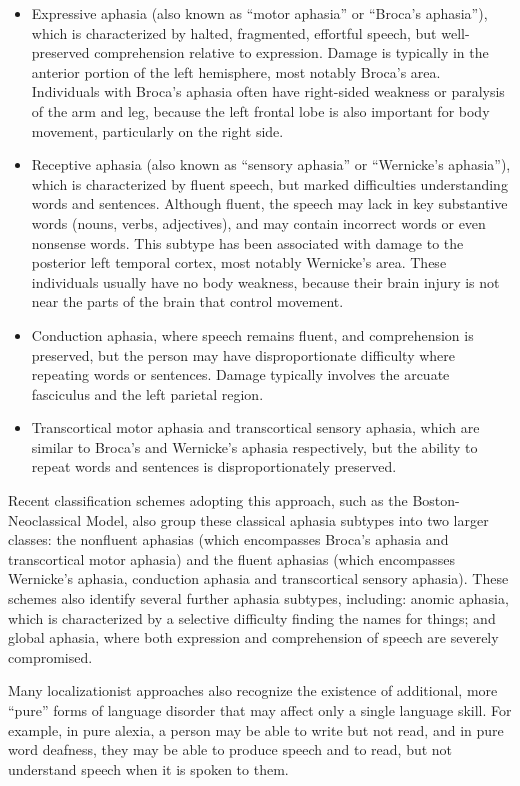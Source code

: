 \begin{itemize}
\tightlist
\item
  Expressive aphasia (also known as ``motor aphasia'' or ``Broca's
  aphasia''), which is characterized by halted, fragmented, effortful
  speech, but well-preserved comprehension relative to expression.
  Damage is typically in the anterior portion of the left hemisphere,
  most notably Broca's area. Individuals with Broca's aphasia often have
  right-sided weakness or paralysis of the arm and leg, because the left
  frontal lobe is also important for body movement, particularly on the
  right side.
\item
  Receptive aphasia (also known as ``sensory aphasia'' or ``Wernicke's
  aphasia''), which is characterized by fluent speech, but marked
  difficulties understanding words and sentences. Although fluent, the
  speech may lack in key substantive words (nouns, verbs, adjectives),
  and may contain incorrect words or even nonsense words. This subtype
  has been associated with damage to the posterior left temporal cortex,
  most notably Wernicke's area. These individuals usually have no body
  weakness, because their brain injury is not near the parts of the
  brain that control movement.
\item
  Conduction aphasia, where speech remains fluent, and comprehension is
  preserved, but the person may have disproportionate difficulty where
  repeating words or sentences. Damage typically involves the arcuate
  fasciculus and the left parietal region.
\item
  Transcortical motor aphasia and transcortical sensory aphasia, which
  are similar to Broca's and Wernicke's aphasia respectively, but the
  ability to repeat words and sentences is disproportionately preserved.
\end{itemize}

Recent classification schemes adopting this approach, such as the
Boston-Neoclassical Model, also group these classical aphasia subtypes
into two larger classes: the nonfluent aphasias (which encompasses
Broca's aphasia and transcortical motor aphasia) and the fluent aphasias
(which encompasses Wernicke's aphasia, conduction aphasia and
transcortical sensory aphasia). These schemes also identify several
further aphasia subtypes, including: anomic aphasia, which is
characterized by a selective difficulty finding the names for things;
and global aphasia, where both expression and comprehension of speech
are severely compromised.

Many localizationist approaches also recognize the existence of
additional, more ``pure'' forms of language disorder that may affect
only a single language skill. For example, in pure alexia, a person may
be able to write but not read, and in pure word deafness, they may be
able to produce speech and to read, but not understand speech when it is
spoken to them.

